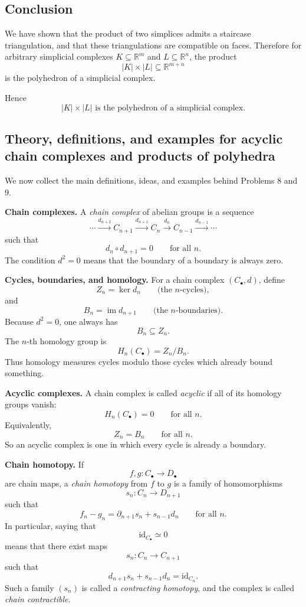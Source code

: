 \documentclass[12pt,a4paper]{article}
\theoremstyle{notespace}
\begin{document}
\subsection{Conclusion}

We have shown that the product of two simplices admits a staircase triangulation, and that these triangulations are compatible on faces. Therefore for arbitrary simplicial complexes \(K\subseteq \mathbb R^m\) and \(L\subseteq \mathbb R^n\), the product
\[
|K|\times |L| \subseteq \mathbb R^{m+n}
\]
is the polyhedron of a simplicial complex.

Hence
\[
\boxed{|K|\times |L|\text{ is the polyhedron of a simplicial complex.}}
\]

\subsection{Theory, definitions, and examples for acyclic chain complexes and products of polyhedra}

We now collect the main definitions, ideas, and examples behind Problems 8 and 9.

\bigskip

\textbf{Chain complexes.}
A \emph{chain complex} of abelian groups is a sequence
\[
\cdots \xrightarrow{d_{n+2}} C_{n+1}\xrightarrow{d_{n+1}} C_n\xrightarrow{d_n} C_{n-1}\xrightarrow{d_{n-1}}\cdots
\]
such that
\[
d_n\circ d_{n+1}=0
\qquad\text{for all }n.
\]
The condition \(d^2=0\) means that the boundary of a boundary is always zero.

\medskip

\textbf{Cycles, boundaries, and homology.}
For a chain complex \((C_\bullet,d)\), define
\[
Z_n=\ker d_n
\qquad\text{(the \(n\)-cycles)},
\]
and
\[
B_n=\operatorname{im} d_{n+1}
\qquad\text{(the \(n\)-boundaries)}.
\]
Because \(d^2=0\), one always has
\[
B_n\subseteq Z_n.
\]
The \(n\)-th homology group is
\[
H_n(C_\bullet)=Z_n/B_n.
\]
Thus homology measures cycles modulo those cycles which already bound something.

\medskip

\textbf{Acyclic complexes.}
A chain complex is called \emph{acyclic} if all of its homology groups vanish:
\[
H_n(C_\bullet)=0
\qquad\text{for all }n.
\]
Equivalently,
\[
Z_n=B_n
\qquad\text{for all }n.
\]
So an acyclic complex is one in which every cycle is already a boundary.

\medskip

\textbf{Chain homotopy.}
If
\[
f,g:C_\bullet\to D_\bullet
\]
are chain maps, a \emph{chain homotopy} from \(f\) to \(g\) is a family of homomorphisms
\[
s_n:C_n\to D_{n+1}
\]
such that
\[
f_n-g_n=\partial_{n+1}s_n+s_{n-1}d_n
\qquad\text{for all }n.
\]
In particular, saying that
\[
\mathrm{id}_{C_\bullet}\simeq 0
\]
means that there exist maps
\[
s_n:C_n\to C_{n+1}
\]
such that
\[
d_{n+1}s_n+s_{n-1}d_n=\mathrm{id}_{C_n}.
\]
Such a family \((s_n)\) is called a \emph{contracting homotopy}, and the complex is called \emph{chain contractible}.
\end{document}

